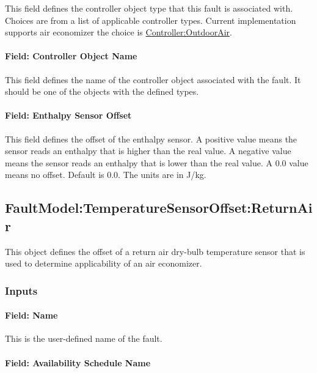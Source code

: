 This field defines the controller object type that this fault is associated with. Choices are from a list of applicable controller types. Current implementation supports air economizer the choice is \hyperref[controlleroutdoorair]{Controller:OutdoorAir}.

\paragraph{Field: Controller Object Name}\label{field-controller-object-name-2}

This field defines the name of the controller object associated with the fault. It should be one of the objects with the defined types.

\paragraph{Field: Enthalpy Sensor Offset}\label{field-enthalpy-sensor-offset}

This field defines the offset of the enthalpy sensor. A positive value means the sensor reads an enthalpy that is higher than the real value. A negative value means the sensor reads an enthalpy that is lower than the real value. A 0.0 value means no offset. Default is 0.0. The units are in J/kg.

\subsection{FaultModel:TemperatureSensorOffset:ReturnAir}\label{faultmodeltemperaturesensoroffsetreturnair}

This object defines the offset of a return air dry-bulb temperature sensor that is used to determine applicability of an air economizer.

\subsubsection{Inputs}\label{inputs-3-022}

\paragraph{Field: Name}\label{field-name-3-020}

This is the user-defined name of the fault.

\paragraph{Field: Availability Schedule Name}\label{field-availability-schedule-name-3-004}


